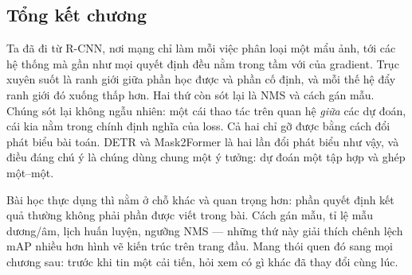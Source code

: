 \documentclass[../../deep_learning.tex]{subfiles}
\begin{document}
\subsection*{Tổng kết chương}
Ta đã đi từ R-CNN, nơi mạng chỉ làm mỗi việc phân loại một mẩu ảnh, tới các hệ thống mà gần như mọi quyết định đều nằm trong tầm với của gradient. Trục xuyên suốt là ranh giới giữa phần học được và phần cố định, và mỗi thế hệ đẩy ranh giới đó xuống thấp hơn. Hai thứ còn sót lại là NMS và cách gán mẫu. Chúng sót lại không ngẫu nhiên: một cái thao tác trên quan hệ \emph{giữa} các dự đoán, cái kia nằm trong chính định nghĩa của loss. Cả hai chỉ gỡ được bằng cách đổi phát biểu bài toán. DETR và Mask2Former là hai lần đổi phát biểu như vậy, và điều đáng chú ý là chúng dùng chung một ý tưởng: dự đoán một tập hợp và ghép một--một.

Bài học thực dụng thì nằm ở chỗ khác và quan trọng hơn: phần quyết định kết quả thường không phải phần được viết trong bài. Cách gán mẫu, tỉ lệ mẫu dương/âm, lịch huấn luyện, ngưỡng NMS --- những thứ này giải thích chênh lệch mAP nhiều hơn hình vẽ kiến trúc trên trang đầu. Mang thói quen đó sang mọi chương sau: trước khi tin một cải tiến, hỏi xem có gì khác đã thay đổi cùng lúc.
\end{document}
